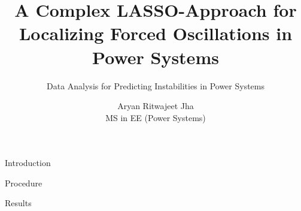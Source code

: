 \documentclass[10pt]{beamer}
\title{A Complex LASSO-Approach for Localizing Forced Oscillations in Power Systems}
\subtitle{Data Analysis for Predicting Instabilities in Power Systems}
\date{}
\author{Aryan Ritwajeet Jha \\MS in EE (Power Systems)}
\institute{Department of Electrical Engineering\\ IIT Delhi}
\begin{document}
\maketitle


{Introduction}


{Procedure}

{Results}


\end{document}
